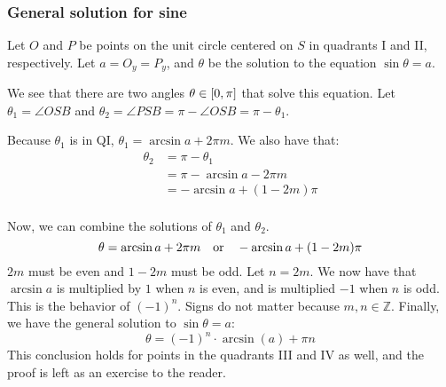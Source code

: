\documentclass{article}
\begin{document}
\subsubsection{General solution for sine}
\begin{minipage}[t]{0.3\linewidth}
\end{minipage}
\begin{minipage}[t]{0.7\linewidth}
Let $O$ and $P$ be points on the unit circle centered on $S$ in
quadrants I and II, respectively. Let $a=O_y=P_y$, and $\theta$ be
the solution to the equation $\sin\theta=a$.

We see that there are two angles $\theta\in\interval[]{0}{\pi}$ that
solve this equation. Let $\theta_1=\angle{OSB}$ and
$\theta_2=\angle{PSB}=\pi-\angle{OSB}=\pi-\theta_1$.

Because $\theta_1$ is in QI, $\theta_1=\arcsin a+2\pi m$. We also
have that:
\begin{align*}
	\theta_2&=\pi-\theta_1 \\
	&=\pi-\arcsin a-2\pi m \\
	&=-\arcsin a+(1-2m)\pi \\
\end{align*}
\end{minipage}

Now, we can combine the solutions of $\theta_1$ and $\theta_2$.
\begin{equation*}
	\theta=\arcsin a+2\pi m\quad\mathrm{or}\quad-\arcsin a+(1-2m)\pi \\
\end{equation*}
$2m$ must be even and $1-2m$ must be odd. Let $n=2m$. We now have
that $\arcsin a$ is multiplied by $1$ when $n$ is even, and is
multiplied $-1$ when $n$ is odd. This is the behavior of $(-1)^n$.
Signs do not matter because $m,n\in\mathbb{Z}$. Finally, we have
the general solution to $\sin\theta=a$:
\begin{equation*}
	\boxed{\theta=(-1)^{n}\cdot\arcsin(a)+\pi n}
\end{equation*}
This conclusion holds for points in the quadrants III and IV as well,
and the proof is left as an exercise to the reader.
\end{document}
